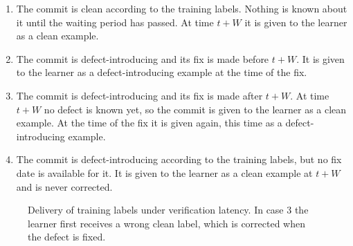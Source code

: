 \documentclass[12pt,a4paper,oneside]{report}
\begin{document}
\begin{enumerate}[leftmargin=*]
\item The commit is clean according to the training labels. Nothing is known
about it until the waiting period has passed. At time $t+W$ it is given to
the learner as a clean example.
\item The commit is defect-introducing and its fix is made before $t+W$. It
is given to the learner as a defect-introducing example at the time of the
fix.
\item The commit is defect-introducing and its fix is made after $t+W$. At
time $t+W$ no defect is known yet, so the commit is given to the learner as
a clean example. At the time of the fix it is given again, this time as a
defect-introducing example.
\item The commit is defect-introducing according to the training labels, but
no fix date is available for it. It is given to the learner as a clean
example at $t+W$ and is never corrected.
\end{enumerate}

\begin{figure}[htbp]
\centering
{}
\caption{Delivery of training labels under verification latency. In case 3
the learner first receives a wrong clean label, which is corrected when the
defect is fixed.}
\label{fig:latency-cases}
\end{figure}
\end{document}
